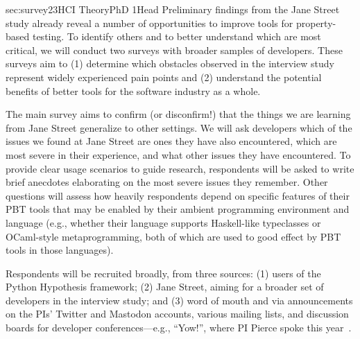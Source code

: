 %
   {sec:survey}{2}{3}{HCI Theory}{PhD 1}{}{Head}
%
Preliminary findings from the Jane Street study already reveal a number of
opportunities to improve tools for property-based testing. To identify
others and to better understand which are most
critical, we will conduct two
surveys with broader samples of developers. These surveys aim to
(1) determine which obstacles observed in the interview
study\iflater{}\fi{}
represent widely experienced pain points and
(2) understand the potential benefits of better tools for the
software industry as a whole.

The main survey
aims to confirm (or disconfirm!) that
the things we are learning from Jane Street generalize to other settings.
We will
ask developers which of the issues we found at Jane Street are
ones they have also encountered, which are most severe
in their experience, and what
other issues they have encountered.
To provide
clear usage scenarios to guide research, respondents will
be asked to write brief anecdotes elaborating on the
most severe issues they remember.  Other questions will assess how
heavily respondents depend on specific features of their PBT tools
that may be enabled by their
ambient programming environment and language (e.g., whether their
language supports Haskell-like typeclasses or OCaml-style
metaprogramming, both of which are used to good effect by
PBT tools in those languages).

Respondents will
be recruited broadly, from three sources: (1)
users of the Python Hypothesis framework; (2) Jane Street, aiming for
a broader set of developers in the interview study; and (3)
word of mouth and via announcements on the PIs' Twitter and Mastodon
accounts, various mailing lists, and discussion boards for developer
conferences---e.g., ``Yow!'', where PI Pierce spoke this
year~\cite{Pierce:Yow22}.

